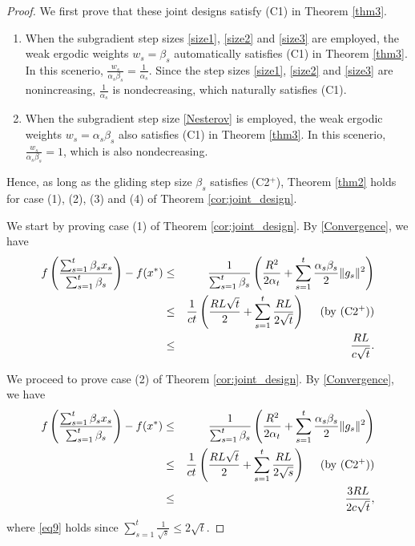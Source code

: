 \documentclass[sn-mathphys]{JORSC-jnl}%
\theoremstyle{thmstyleone}%
\theoremstyle{thmstylethree}%
\begin{document}
\begin{proof}
	We first prove that these joint designs satisfy (C1) in Theorem \ref{thm3}.
	\begin{enumerate}
		\item When the subgradient step sizes \eqref{size1}, \eqref{size2} and \eqref{size3} are employed, the weak ergodic weights $w_s = \beta_s$ automatically satisfies (C1) in Theorem \ref{thm3}. In this scenerio, $\frac{w_s}{\alpha_s \beta_s} = \frac{1}{\alpha_s}$. Since the step sizes \eqref{size1}, \eqref{size2} and \eqref{size3} are nonincreasing, $\frac{1}{\alpha_s}$ is nondecreasing, which naturally satisfies (C1).
		\item When the subgradient step size \eqref{Nesterov} is employed, the weak ergodic weights $w_s = \alpha_s\beta_s$ also satisfies (C1) in Theorem \ref{thm3}. In this scenerio, $\frac{w_s}{\alpha_s \beta_s} = 1$, which is also nondecreasing. 
	\end{enumerate}
	Hence, as long as the gliding step size $\beta_s$ satisfies (C2$^+$), Theorem \ref{thm2} holds for case (1), (2), (3) and (4) of Theorem \ref{cor:joint_design}.
	
	We start by proving case (1) of Theorem \ref{cor:joint_design}. By \eqref{Convergence}, we have
	\begin{eqnarray}
		f\left( \frac{\sum_{s=1}^t \beta_s x_s}{\sum_{s=1}^t \beta_s} \right) - f(x^*) 
		&\leq& \frac{1}{\sum_{s=1}^{t}\beta_s}
		\left(
		\frac{R^2}{2 \alpha_t}
		+ \sum_{s=1}^{t} \frac{\alpha_s \beta_s}{2} \Vert g_s \Vert^2
		\right)\nonumber\\
		&\leq&\frac{1}{ct}\left(\frac{RL\sqrt{t}}{2}+\sum_{s=1}^{t} \frac{RL}{2\sqrt{t}}\right)~~~~({\rm by~ (C2^+)})\nonumber\\
		&\leq& \frac{RL}{c\sqrt{t}}.\nonumber
	\end{eqnarray}
	
	We proceed to prove case (2) of Theorem \ref{cor:joint_design}. By \eqref{Convergence}, we have
	\begin{eqnarray}
		f\left( \frac{\sum_{s=1}^t \beta_s x_s}{\sum_{s=1}^t \beta_s} \right) - f(x^*) 
		&\leq& \frac{1}{\sum_{s=1}^{t}\beta_s}
		\left(
		\frac{R^2}{2 \alpha_t}
		+ \sum_{s=1}^{t} \frac{\alpha_s \beta_s}{2} \Vert g_s \Vert^2
		\right)\nonumber\\
		&\leq&\frac{1}{ct}\left(\frac{RL\sqrt{t}}{2}+\sum_{s=1}^{t} \frac{RL}{2\sqrt{s}}\right)~~~~({\rm by~ (C2^+)})\nonumber\\
		&\leq& \frac{3RL}{2c\sqrt{t}},\label{eq9}
	\end{eqnarray}
	where \eqref{eq9} holds since $\sum_{s=1}^{t} \frac{1}{\sqrt{s}} \le 2\sqrt{t}$.
	

\end{proof}
\end{document}
